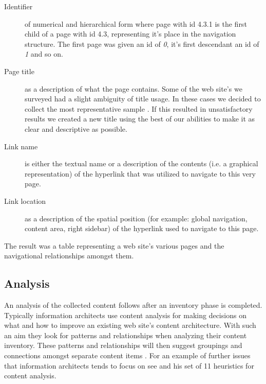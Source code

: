 \begin{description}
  \item[Identifier] of numerical and hierarchical form where page with id
    4.3.1 is the first child of a page with id 4.3, representing it's place in
    the navigation structure. The first page was given an id of \emph{0}, it's
    first descendant an id of \emph{1} and so on.
  \item[Page title] as a description of what the page contains. Some of the
    web site's we surveyed had a slight ambiguity of title usage. In these
    cases we decided to collect the most representative sample%
    .
    If this resulted in unsatisfactory results we created a new title using
    the best of our abilities to make it as clear and descriptive as possible.
  \item[Link name] is either the textual name or a description of the
    contents (i.e. a graphical representation) of the hyperlink that was
    utilized to navigate to this very page.
  \item[Link location] as a description of the spatial position
    (for example: global navigation, content area, right sidebar) of the
    hyperlink used to navigate to this page.
\end{description}


The result was a table representing a web site's various pages and the
navigational relationships amongst them.

\subsection{Analysis}

An analysis of the collected content follows after an inventory phase is
completed. Typically information architects use content analysis for
making decisions on what and how to improve an existing web site's content
architecture. With such an aim they look for patterns and relationships when
analyzing their content inventory. These patterns and relationships will then
suggest groupings and connections amongst separate content items
\cite[p.~243]{morville06}. For an example of further issues that information
architects tends to focus on see \citet{leise07} and his set of 11 heuristics%
for content analysis.

